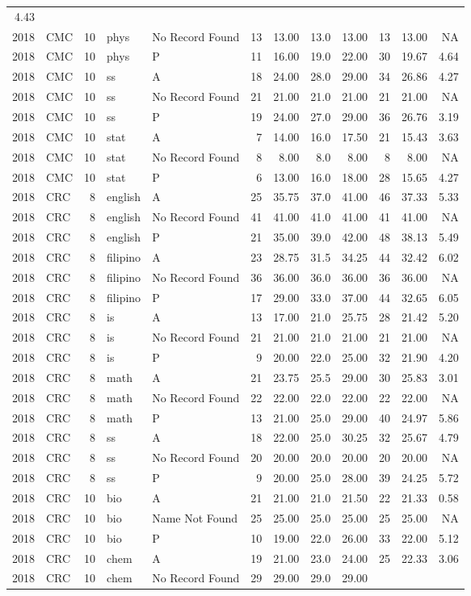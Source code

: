 \documentclass[]{article}
\begin{document}
\begin{longtable}[]{@{}rlrllrrrrrrr@{}}
4.43\tabularnewline
2018 & CMC & 10 & phys & No Record Found & 13 & 13.00 & 13.0 & 13.00 &
13 & 13.00 & NA\tabularnewline
2018 & CMC & 10 & phys & P & 11 & 16.00 & 19.0 & 22.00 & 30 & 19.67 &
4.64\tabularnewline
2018 & CMC & 10 & ss & A & 18 & 24.00 & 28.0 & 29.00 & 34 & 26.86 &
4.27\tabularnewline
2018 & CMC & 10 & ss & No Record Found & 21 & 21.00 & 21.0 & 21.00 & 21
& 21.00 & NA\tabularnewline
2018 & CMC & 10 & ss & P & 19 & 24.00 & 27.0 & 29.00 & 36 & 26.76 &
3.19\tabularnewline
2018 & CMC & 10 & stat & A & 7 & 14.00 & 16.0 & 17.50 & 21 & 15.43 &
3.63\tabularnewline
2018 & CMC & 10 & stat & No Record Found & 8 & 8.00 & 8.0 & 8.00 & 8 &
8.00 & NA\tabularnewline
2018 & CMC & 10 & stat & P & 6 & 13.00 & 16.0 & 18.00 & 28 & 15.65 &
4.27\tabularnewline
2018 & CRC & 8 & english & A & 25 & 35.75 & 37.0 & 41.00 & 46 & 37.33 &
5.33\tabularnewline
2018 & CRC & 8 & english & No Record Found & 41 & 41.00 & 41.0 & 41.00 &
41 & 41.00 & NA\tabularnewline
2018 & CRC & 8 & english & P & 21 & 35.00 & 39.0 & 42.00 & 48 & 38.13 &
5.49\tabularnewline
2018 & CRC & 8 & filipino & A & 23 & 28.75 & 31.5 & 34.25 & 44 & 32.42 &
6.02\tabularnewline
2018 & CRC & 8 & filipino & No Record Found & 36 & 36.00 & 36.0 & 36.00
& 36 & 36.00 & NA\tabularnewline
2018 & CRC & 8 & filipino & P & 17 & 29.00 & 33.0 & 37.00 & 44 & 32.65 &
6.05\tabularnewline
2018 & CRC & 8 & is & A & 13 & 17.00 & 21.0 & 25.75 & 28 & 21.42 &
5.20\tabularnewline
2018 & CRC & 8 & is & No Record Found & 21 & 21.00 & 21.0 & 21.00 & 21 &
21.00 & NA\tabularnewline
2018 & CRC & 8 & is & P & 9 & 20.00 & 22.0 & 25.00 & 32 & 21.90 &
4.20\tabularnewline
2018 & CRC & 8 & math & A & 21 & 23.75 & 25.5 & 29.00 & 30 & 25.83 &
3.01\tabularnewline
2018 & CRC & 8 & math & No Record Found & 22 & 22.00 & 22.0 & 22.00 & 22
& 22.00 & NA\tabularnewline
2018 & CRC & 8 & math & P & 13 & 21.00 & 25.0 & 29.00 & 40 & 24.97 &
5.86\tabularnewline
2018 & CRC & 8 & ss & A & 18 & 22.00 & 25.0 & 30.25 & 32 & 25.67 &
4.79\tabularnewline
2018 & CRC & 8 & ss & No Record Found & 20 & 20.00 & 20.0 & 20.00 & 20 &
20.00 & NA\tabularnewline
2018 & CRC & 8 & ss & P & 9 & 20.00 & 25.0 & 28.00 & 39 & 24.25 &
5.72\tabularnewline
2018 & CRC & 10 & bio & A & 21 & 21.00 & 21.0 & 21.50 & 22 & 21.33 &
0.58\tabularnewline
2018 & CRC & 10 & bio & Name Not Found & 25 & 25.00 & 25.0 & 25.00 & 25
& 25.00 & NA\tabularnewline
2018 & CRC & 10 & bio & P & 10 & 19.00 & 22.0 & 26.00 & 33 & 22.00 &
5.12\tabularnewline
2018 & CRC & 10 & chem & A & 19 & 21.00 & 23.0 & 24.00 & 25 & 22.33 &
3.06\tabularnewline
2018 & CRC & 10 & chem & No Record Found & 29 & 29.00 & 29.0 & 29.00 &

\end{longtable}
\end{document}
